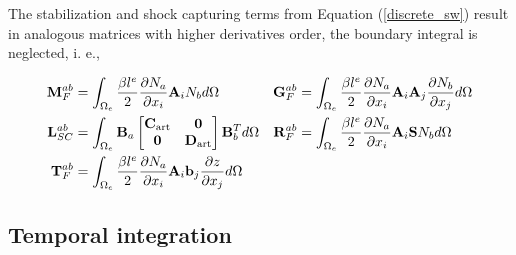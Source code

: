 The stabilization and shock capturing terms from Equation (\ref{discrete_sw}) result in analogous matrices with higher derivatives order, the boundary integral is neglected, i. e.,

\begin{align}
\displaystyle\mathbf{M}_F^{ab} &= \int_{\Omega_e} \frac{\beta l^e}{2} \frac{\partial N_a}{\partial x_i}\mathbf{A}_i N_b d\Omega &
\displaystyle\mathbf{G}_F^{ab} &= \int_{\Omega_e} \frac{\beta l^e}{2} \frac{\partial N_a}{\partial x_i}\mathbf{A}_i\mathbf{A}_j \frac{\partial N_b}{\partial x_j} d\Omega \nonumber\\
\displaystyle\mathbf{L}_{SC}^{ab} &= \int_{\Omega_e} \mathbf{B}_a \left[\begin{matrix}
        \mathbf{C}_\text{art} & \mathbf{0} \\ \mathbf{0} & \mathbf{D}_\text{art}
    \end{matrix}\right] \mathbf{B}_b^T d\Omega &
\displaystyle\mathbf{R}_F^{ab} &= \int_{\Omega_e} \frac{\beta l^e}{2} \frac{\partial N_a}{\partial x_i}\mathbf{A}_i \mathbf{S} N_b d\Omega \\
\displaystyle\mathbf{T}_F^{ab} &= \int_{\Omega_e} \frac{\beta l^e}{2} \frac{\partial N_a}{\partial x_i}\mathbf{A}_i \mathbf{b}_j \frac{\partial z}{\partial x_j} d\Omega
\nonumber
\end{align}



\subsection{Temporal integration}
\label{sec:time_integration_bdf}

